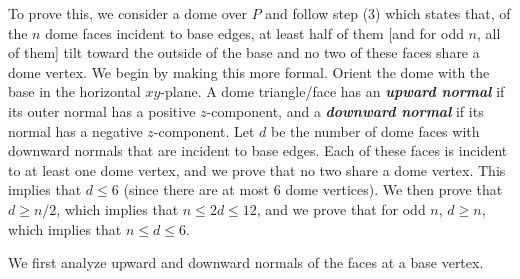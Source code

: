 \documentclass[11pt]{article}
\def\defn#1{\textit{\textbf{\boldmath #1}}}
\newcommand{\JOR}[1]{{\color{red} JOR: [#1]}}
\newcommand{\Anna}[1]{{\color{red} Anna: [#1]}}
\newcommand{\pepa}[1]{{\color{brown} #1}}
\newcommand{\old}[1]{{\color{gray} Old: [#1]}}
\begin{document}
To prove this, we 
consider a dome over $P$ and
follow step (3) which states that, of the $n$ dome faces incident to base edges, at least half of them [and for odd $n$, all of them] tilt toward the outside of the base
and no two of these faces share a dome vertex.
We begin by making this more formal.
Orient the dome with the base in the horizontal $xy$-plane. A dome triangle/face has an \defn{upward normal} if its outer normal has a 
positive $z$-component, and a \defn{downward normal} if its normal has a negative $z$-component.
Let $d$ be the number of dome faces with downward normals that are incident to base edges. 
Each of these faces %
is incident to
at least one dome vertex, and we prove that no two share a dome vertex.
This implies that $d \le 6$ (since there are at most $6$ dome vertices).  We then prove that  
$d \ge n/2$, which implies that $n \le 2d \le 12$, and we prove that for odd $n$, 
$d \ge n$, which implies that $n \le d \le 6$.


We first analyze upward and downward normals of the faces at a base vertex.
\end{document}
